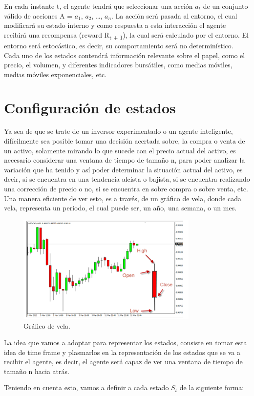 En cada instante t, el agente tendrá que seleccionar una acción $a_t$  de un conjunto válido de acciones A = {$a_1$, $a_2$, …, $a_n$}. La acción será pasada al entorno, el cual modificará su estado interno y como respuesta a esta interacción el agente recibirá una recompensa (reward R\textsubscript{t + 1}), la cual será calculado por el entorno. El entorno será estocástico, es decir, su comportamiento será no determinístico. Cada uno de los estados contendrá información relevante sobre el papel, como el precio, el volumen, y diferentes indicadores bursátiles, como medias móviles, medias móviles exponenciales, etc.

\section{Configuración de estados}

Ya sea de que se trate de un inversor experimentado o un agente inteligente, difícilmente sea posible tomar una decisión acertada sobre, la compra o venta de un activo, solamente mirando lo que sucede con el precio actual 
del activo, es necesario considerar una ventana de tiempo de tamaño n, para poder analizar la variación que ha tenido y así poder determinar la situación actual del activo, es decir, si se encuentra en una tendencia
alcista o bajista, si se encuentra realizando una corrección de precio o no, si se encuentra en sobre compra o sobre venta, etc. Una manera eficiente de ver esto, es a través, de un gráfico de vela, donde cada vela, representa un periodo, el cual puede ser, un año, una semana, o un mes.

\begin{figure}[h!]
	\centering
	\includegraphics[scale=0.75]{imagenes/candleChart.png}
	\caption{Gráfico de vela.}
\end{figure}

La idea que vamos a adoptar para representar los estados, consiste en tomar esta idea de time frame y plasmarlos en la representación de los estados que se va a recibir el agente, es decir, el agente será capaz de ver una ventana de tiempo de tamaño n hacia atrás.

Teniendo en cuenta esto, vamos a definir a cada estado $S_t$  de la siguiente forma:

